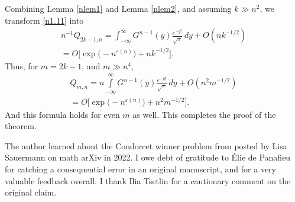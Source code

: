 \documentclass[11pt]{amsart}
\def\eps{\varepsilon}
\def\a{\alpha}
\theoremstyle{remark}
\numberwithin{equation}{section}
\begin{document}
Combining Lemma \ref{nlem1} and Lemma \ref{nlem2}, and assuming $k\gg n^2$, we transform \eqref{n1.11} into
\begin{multline*}
n^{-1}Q_{2k-1,n}=\int_{-\infty}^{\infty}\!\!G^{n-1}(y)\frac{e^{-y^2}}{\sqrt{\pi}}\,dy+O(nk^{-1/2})\\
=O\bigl[\exp\bigl(-n^{\eps(n)}\bigr)+nk^{-1/2}\bigr].
\end{multline*}
Thus, for $m=2k-1$, and $m\gg n^4$,
\begin{multline*}
Q_{m,n}\!=\!n\!\!\int\limits_{-\infty}^{\infty}\!\!\!G^{n-1}(y)\frac{e^{-y^2}}{\sqrt{\pi}}\,dy+O(n^2m^{-1/2})\\
=O\bigl[\exp\bigl(-n^{\eps(n)}\bigr)+n^2 m^{-1/2}\bigr].
\end{multline*}
And this formula holds for even $m$ as well. This completes the proof of the theorem.







 The author learned about the Condorcet winner problem from \cite{Sau} posted
by Lisa Sauermann on math arXiv in 2022. I owe debt of gratitude to \'Elie de Panafieu for catching a consequential error in an original manuscript, and for a very valuable feedback overall. I thank Ilia Tsetlin for a cautionary comment on the original claim.
\end{document}
